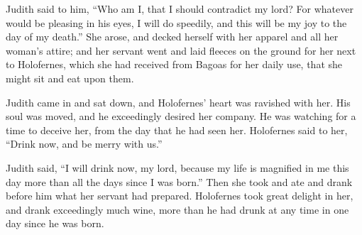 {\par }{\PP {}Judith said to him, “Who am I, that I should contradict my lord? For whatever would be pleasing in his eyes, I will do speedily, and this will be my joy to the day of my death.”
She arose, and decked herself with her apparel and all her woman’s attire; and her servant went and laid fleeces on the ground for her next to Holofernes, which she had received from Bagoas for her daily use, that she might sit and eat upon them.
\par }{\PP {}Judith came in and sat down, and Holofernes’ heart was ravished with her. His soul was moved, and he exceedingly desired her company. He was watching for a time to deceive her, from the day that he had seen her.
Holofernes said to her, “Drink now, and be merry with us.”
\par }{\PP {}Judith said, “I will drink now, my lord, because my life is magnified in me this day more than all the days since I was born.”
Then she took and ate and drank before him what her servant had prepared.
Holofernes took great delight in her, and drank exceedingly much wine, more than he had drunk at any time in one day since he was born.

}
